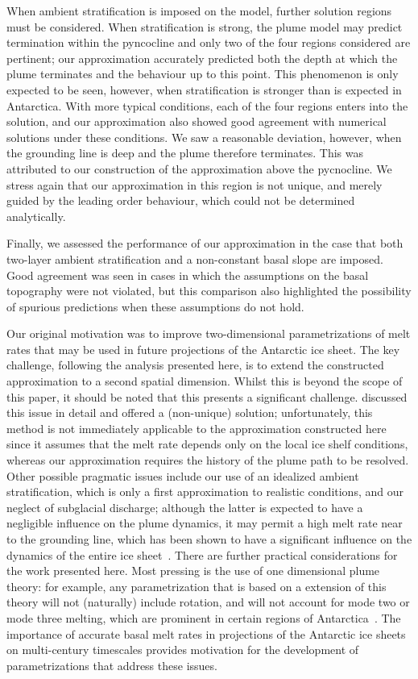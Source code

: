\documentclass[openacc]{rsproca_new}%
\begin{document}
When ambient stratification is imposed on the model, further solution regions must be considered. When stratification is strong, the plume model may predict termination within the pyncocline and only two of the four regions considered are pertinent; our approximation accurately predicted both the depth at which the plume terminates and the behaviour up to this point. This phenomenon is only expected to be seen, however, when stratification is stronger than is expected in Antarctica. With more typical conditions, each of the four regions enters into the solution, and our approximation also showed good agreement with numerical solutions under these conditions. We saw a reasonable deviation, however, when the grounding line is deep and the plume therefore terminates. This was attributed to our construction of the approximation above the pycnocline. We stress again that our approximation in this region is not unique, and merely guided by the leading order behaviour, which could not be determined analytically. 

Finally, we assessed the performance of our approximation in the case that both two-layer ambient stratification and a non-constant basal slope are imposed. Good agreement was seen in cases in which the assumptions on the basal topography were not violated, but this comparison also highlighted the possibility of spurious predictions when these assumptions do not hold.

Our original motivation was to improve two-dimensional parametrizations of melt rates that may be used in future projections of the Antarctic ice sheet. The key challenge, following the analysis presented here, is to extend the constructed approximation to a second spatial dimension. Whilst this is beyond the scope of this paper, it should be noted that this presents a significant challenge. \citet{Lazeroms2018TheCryo} discussed this issue in detail and offered a (non-unique) solution; unfortunately, this method is not immediately applicable to the approximation constructed here since it assumes that the melt rate depends only on the local ice shelf conditions, whereas our approximation requires the history of the plume path to be resolved. Other possible pragmatic issues include our use of an idealized ambient stratification, which is only a first approximation to realistic conditions, and our neglect of subglacial discharge; although the latter is expected to have a negligible influence on the plume dynamics, it may permit a high melt rate near to the grounding line, which has been shown to have a significant influence on the dynamics of the entire ice sheet~\citep{Arthern2017GRL}. There are further practical considerations for the work presented here. Most pressing is the use of one dimensional plume theory: for example, any parametrization that is based on a extension of this theory will not (naturally) include rotation, and will not account for mode two or mode three melting, which are prominent in certain regions of Antarctica~\citep{Adusumilli2020NatureGeo}. The importance of accurate basal melt rates in projections of the Antarctic ice sheets on multi-century timescales provides motivation for the development of parametrizations that address these issues. 
\end{document}
